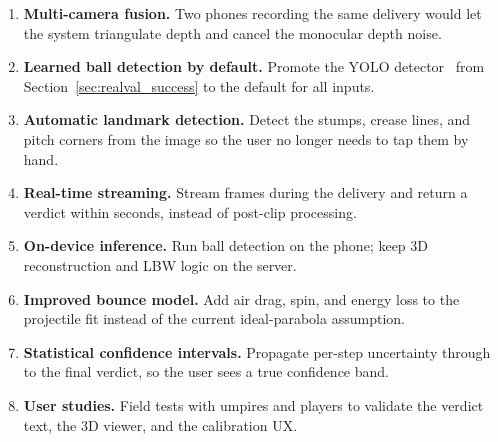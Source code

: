 \documentclass[12pt,a4paper]{report}
\begin{document}
\begin{enumerate}
    \item \textbf{Multi-camera fusion.} Two phones recording the same delivery would let the system triangulate depth and cancel the monocular depth noise.
    \item \textbf{Learned ball detection by default.} Promote the YOLO detector~\cite{redmon2016,ultralytics2023} from Section~\ref{sec:realval_success} to the default for all inputs.
    \item \textbf{Automatic landmark detection.} Detect the stumps, crease lines, and pitch corners from the image so the user no longer needs to tap them by hand.
    \item \textbf{Real-time streaming.} Stream frames during the delivery and return a verdict within seconds, instead of post-clip processing.
    \item \textbf{On-device inference.} Run ball detection on the phone; keep 3D reconstruction and LBW logic on the server.
    \item \textbf{Improved bounce model.} Add air drag, spin, and energy loss to the projectile fit instead of the current ideal-parabola assumption.
    \item \textbf{Statistical confidence intervals.} Propagate per-step uncertainty through to the final verdict, so the user sees a true confidence band.
    \item \textbf{User studies.} Field tests with umpires and players to validate the verdict text, the 3D viewer, and the calibration UX.
\end{enumerate}
\end{document}
